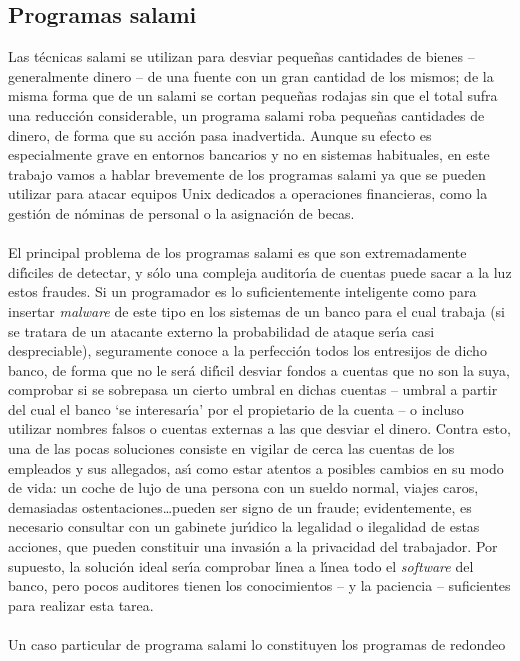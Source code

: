\subsection{Programas salami}
Las t\'ecnicas salami se utilizan para desviar peque\~nas cantidades de 
bienes -- generalmente dinero -- de una fuente con un gran cantidad de los 
mismos; de la misma forma que de un salami se cortan peque\~nas rodajas sin que
el total sufra una reducci\'on considerable, un programa salami roba peque\~nas
cantidades de dinero, de forma que su acci\'on pasa inadvertida. Aunque su 
efecto es especialmente
grave en entornos bancarios y no en sistemas habituales, en este trabajo vamos a
hablar brevemente de los programas salami ya que se pueden utilizar para atacar
equipos Unix dedicados a operaciones financieras, como la gesti\'on de n\'ominas
de personal o la asignaci\'on de becas.\\
\\El principal problema de los programas salami es que son extremadamente 
dif\'{\i}ciles de detectar, y s\'olo una compleja auditor\'{\i}a de cuentas
puede sacar a la luz estos fraudes. Si un programador es lo suficientemente
inteligente como para insertar {\it malware} de este tipo en los sistemas de
un banco para el cual trabaja (si se tratara de un atacante externo la 
probabilidad de ataque ser\'{\i}a casi despreciable), seguramente conoce a la
perfecci\'on todos los entresijos de dicho banco, de forma que no le ser\'a
dif\'{\i}cil desviar fondos a cuentas que no son la suya, comprobar si se 
sobrepasa un cierto umbral en dichas cuentas -- umbral a partir del cual el
banco `se interesar\'{\i}a' por el propietario de la cuenta -- o incluso 
utilizar nombres falsos o cuentas externas a las que desviar el dinero. Contra
esto, una de las pocas soluciones consiste en vigilar de cerca las cuentas de
los empleados y sus allegados, as\'{\i} como estar atentos a posibles cambios 
en su modo de vida: un coche de lujo de una persona con un sueldo normal, 
viajes caros, demasiadas ostentaciones\ldots pueden ser signo de un fraude;
evidentemente, es necesario consultar con un gabinete jur\'{\i}dico la 
legalidad o ilegalidad de estas acciones, que pueden constituir una invasi\'on
a la privacidad del trabajador. Por supuesto, la soluci\'on ideal ser\'{\i}a 
comprobar l\'{\i}nea a l\'{\i}nea todo el {\it software} del banco, pero pocos 
auditores tienen los conocimientos -- y la paciencia -- suficientes para 
realizar esta tarea.\\
\\Un caso particular de programa salami lo constituyen los programas de redondeo
